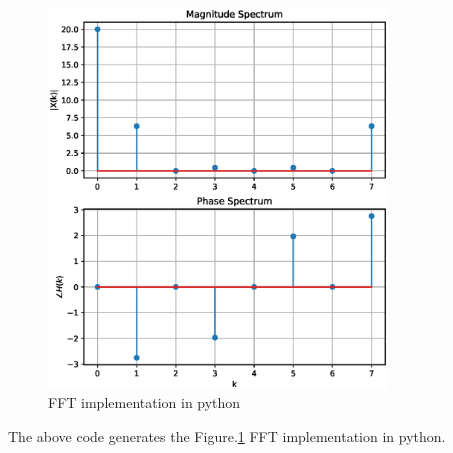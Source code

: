 \documentclass[journal,12pt,twocolumn]{IEEEtran}
\begin{document}
\begin{figure}
    \centering
    \includegraphics[width=9cm]{./figs/fft_py.eps}
    \caption{FFT implementation in python}
    \label{fig:fft_py}
\end{figure}
The above code generates the Figure.\ref{fig:fft_py} FFT implementation in python.
\end{document}
